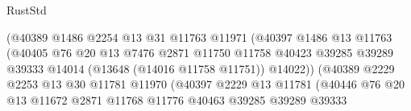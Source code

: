 \begin{lexlean}{RustStd}
\begin{coremodule}
                                          (@40389
                                            @1486
                                            @2254
                                            @13
                                            @31
                                            @11763
                                            @11971
                                            (@40397
                                              @1486
                                              @13
                                              @11763
                                              (@40405
                                                @76
                                                @20
                                                @13
                                                @7476
                                                @2871
                                                @11750
                                                @11758
                                                @40423
                                                @39285
                                                @39289
                                                @39333
                                                @14014
                                                (@13648 (@14016 @11758 @11751))
                                                @14022))
                                            (@40389
                                              @2229
                                              @2253
                                              @13
                                              @30
                                              @11781
                                              @11970
                                              (@40397
                                                @2229
                                                @13
                                                @11781
                                                (@40446
                                                  @76
                                                  @20
                                                  @13
                                                  @11672
                                                  @2871
                                                  @11768
                                                  @11776
                                                  @40463
                                                  @39285
                                                  @39289
                                                  @39333

\end{coremodule}
\end{lexlean}
